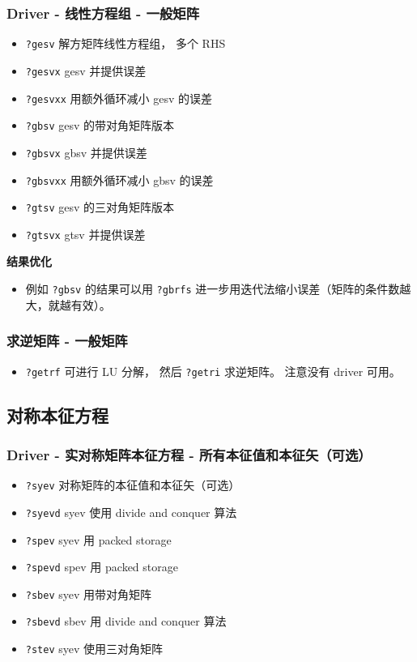 \subsubsection{Driver - 线性方程组 - 一般矩阵}
\begin{itemize}
\item \verb|?gesv| 解方矩阵线性方程组， 多个 RHS
\item \verb|?gesvx| gesv 并提供误差
\item \verb|?gesvxx| 用额外循环减小 gesv 的误差
\item \verb|?gbsv| gesv 的带对角矩阵版本
\item \verb|?gbsvx| gbsv 并提供误差
\item \verb|?gbsvxx| 用额外循环减小 gbsv 的误差
\item \verb|?gtsv| gesv 的三对角矩阵版本
\item \verb|?gtsvx| gtsv 并提供误差
\end{itemize}

\textbf{结果优化}
\begin{itemize}
\item 例如 \verb|?gbsv| 的结果可以用 \verb|?gbrfs| 进一步用迭代法缩小误差（矩阵的条件数越大，就越有效）。
\end{itemize}

\subsubsection{求逆矩阵 - 一般矩阵}
\begin{itemize}
\item \verb|?getrf| 可进行 LU 分解， 然后 \verb|?getri| 求逆矩阵。 注意没有 driver 可用。
\end{itemize}


\subsection{对称本征方程}
\subsubsection{Driver - 实对称矩阵本征方程 - 所有本征值和本征矢（可选）}
\begin{itemize}
\item \verb|?syev| 对称矩阵的本征值和本征矢（可选）
\item \verb|?syevd| syev 使用 divide and conquer 算法
\item \verb|?spev| syev 用 packed storage
\item \verb|?spevd| spev 用 packed storage
\item \verb|?sbev| syev 用带对角矩阵
\item \verb|?sbevd| sbev 用 divide and conquer 算法
\item \verb|?stev| syev 使用三对角矩阵
\end{itemize}

